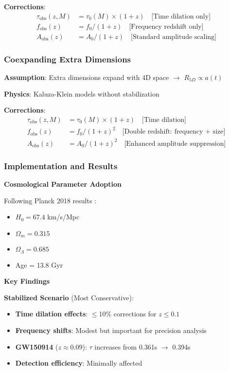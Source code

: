 \documentclass[11pt,a4paper]{article}
\begin{document}
\textbf{Corrections}:
\begin{align}
\tau_{\text{obs}}(z,M) &= \tau_0(M) \times (1+z) \quad \text{[Time dilation only]} \\
f_{\text{obs}}(z) &= f_0 / (1+z) \quad \text{[Frequency redshift only]} \\
A_{\text{obs}}(z) &= A_0 / (1+z) \quad \text{[Standard amplitude scaling]}
\end{align}

\subsubsection{Coexpanding Extra Dimensions}

\textbf{Assumption}: Extra dimensions expand with 4D space $\to$ $R_{5D} \propto a(t)$

\textbf{Physics}: Kaluza-Klein models without stabilization

\textbf{Corrections}:
\begin{align}
\tau_{\text{obs}}(z,M) &= \tau_0(M) \times (1+z) \quad \text{[Time dilation]} \\
f_{\text{obs}}(z) &= f_0 / (1+z)^2 \quad \text{[Double redshift: frequency + size]} \\
A_{\text{obs}}(z) &= A_0 / (1+z)^2 \quad \text{[Enhanced amplitude suppression]}
\end{align}

\subsubsection{Implementation and Results}

\textbf{Cosmological Parameter Adoption}

Following Planck 2018 results \cite{planck2020}:
\begin{itemize}
    \item $H_0 = 67.4$ km/s/Mpc
    \item $\Omega_m = 0.315$
    \item $\Omega_\Lambda = 0.685$
    \item Age = 13.8 Gyr
\end{itemize}

\textbf{Key Findings}

\textbf{Stabilized Scenario} (Most Conservative):
\begin{itemize}
    \item \textbf{Time dilation effects}: $\leq$10\% corrections for $z\leq 0.1$
    \item \textbf{Frequency shifts}: Modest but important for precision analysis
    \item \textbf{GW150914} ($z\approx 0.09$): $\tau$ increases from 0.361s $\to$ 0.394s
    \item \textbf{Detection efficiency}: Minimally affected
\end{itemize}
\end{document}
